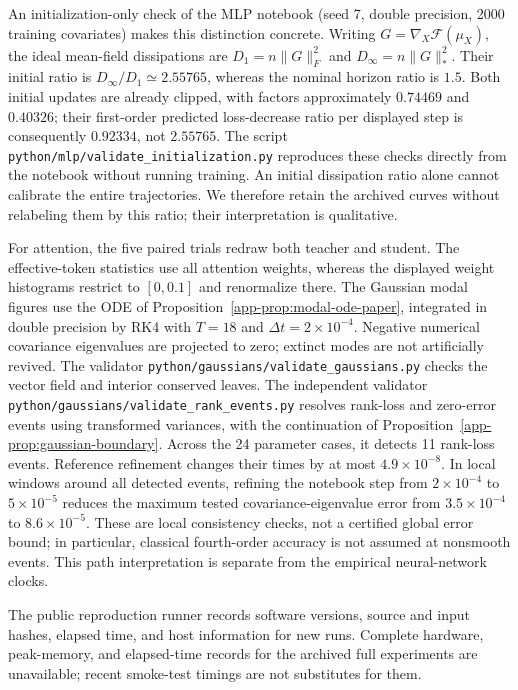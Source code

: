 \documentclass{article}
\newcommand{\MF}{\mathcal{F}}
\begin{document}
An initialization-only check of the MLP notebook (seed 7, double precision,
2000 training covariates) makes this distinction concrete. Writing
$G=\nabla_X\MF(\mu_X)$, the ideal mean-field dissipations are
$D_1=n\|G\|_F^2$ and $D_\infty=n\|G\|_*^2$. Their initial ratio is
$D_\infty/D_1\simeq2.55765$, whereas the nominal horizon ratio is $1.5$.
Both initial updates are already clipped, with factors approximately
$0.74469$ and $0.40326$; their first-order predicted loss-decrease ratio
per displayed step is consequently $0.92334$, not $2.55765$.
The script \texttt{python/mlp/validate\_initialization.py} reproduces these
checks directly from the notebook without running training. An initial
dissipation ratio alone cannot calibrate the entire trajectories.
We therefore retain the archived curves without relabeling them by this
ratio; their interpretation is qualitative.

For attention, the five paired trials redraw both teacher and student.
The effective-token statistics use all attention weights, whereas the
displayed weight histograms restrict to $[0,0.1]$ and renormalize there.
The Gaussian modal figures use the ODE of
Proposition~\ref{app-prop:modal-ode-paper}, integrated in double precision by
RK4 with $T=18$ and $\Delta t=2\times10^{-4}$. Negative numerical covariance
eigenvalues are projected to zero; extinct modes are not artificially revived.
The validator \texttt{python/gaussians/validate\_gaussians.py} checks the
vector field and interior conserved leaves. The independent validator
\texttt{python/gaussians/validate\_rank\_events.py} resolves rank-loss and
zero-error events using transformed variances, with the continuation of
Proposition~\ref{app-prop:gaussian-boundary}. Across the 24 parameter cases,
it detects 11 rank-loss events. Reference refinement changes their times by
at most $4.9\times10^{-8}$. In local windows around all detected events,
refining the notebook step from $2\times10^{-4}$ to $5\times10^{-5}$ reduces
the maximum tested covariance-eigenvalue error from $3.5\times10^{-4}$ to
$8.6\times10^{-5}$. These are local consistency checks, not a certified
global error bound; in particular, classical fourth-order accuracy is not
assumed at nonsmooth events. This path interpretation is separate from the
empirical neural-network clocks.

The public reproduction runner records software versions, source and input
hashes, elapsed time, and host information for new runs. Complete hardware,
peak-memory, and elapsed-time records for the archived full experiments
are unavailable; recent smoke-test timings are not substitutes for them.
\end{document}
